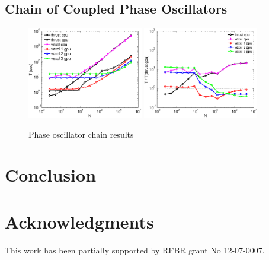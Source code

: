 \documentclass[1p]{elsarticle}
\begin{document}
\subsection{Chain of Coupled Phase Oscillators}

\begin{figure}
    \begin{center}
	\includegraphics[width=0.45\textwidth]{data/phase_oscillator_chain/abs}
	\includegraphics[width=0.45\textwidth]{data/phase_oscillator_chain/rel}
    \end{center}
    \caption{Phase oscillator chain results}
    \label{fig:phase:perf}
\end{figure}

\section{Conclusion}

\section{Acknowledgments}

This work has been partially supported by RFBR grant No 12-07-0007.

\nocite{*}


\end{document}
